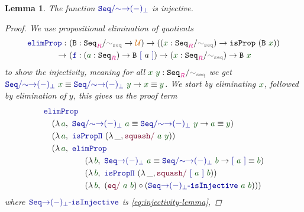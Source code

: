 \documentclass[twoside,11pt,openright]{report}
\theoremstyle{plain} %
\newtheorem{lem}[thm]{Lemma}
\theoremstyle{definition}
\theoremstyle{remark}
\newcommand*{\term}[1]{\textcolor{green!30!black}{#1}} %
\newcommand*{\type}[1]{\textcolor{magenta!90!black}{#1}}
\newcommand*{\universe}[1]{\textcolor{orange!80!black}{#1}}
\newcommand*{\relation}[1]{\textcolor{gray}{\ensuremath{\mathtt{#1}}}}
\newcommand*{\function}[1]{\textcolor{blue!60!black}{\ensuremath{\mathtt{#1}}}}
\newcommand*{\constructor}[1]{\textcolor{purple!60!black}{\ensuremath{\mathtt{#1}}}}
\newcommand*{\typeformer}[1]{\ensuremath{\mathtt{#1}}}
\begin{document}
\begin{lem}
  The function \(\function{Seq/{\sim}{\rightarrow}(-)_\bot}\) is injective.
  \begin{proof}
    We use propositional elimination of quotients 
    \begin{equation}
      \begin{aligned}
        \function{elimProp} :~& (\typeformer{B} :\typeformer{Seq}_{\type{R}} / \relation{\sim_{seq}} \rightarrow \universe{\mathcal{U}}) \rightarrow ((\term{x} : \typeformer{Seq}_{\type{R}} / \relation{\sim_{seq}}) \rightarrow \typeformer{isProp}~(\typeformer{B}~\term{x})) \\
        \rightarrow~& (\function{f} : (\term{a} : \typeformer{Seq}_{\type{R}}) \rightarrow \typeformer{B}~\function{[}~a~\function{]}) \rightarrow (\term{x} : \typeformer{Seq}_{\type{R}} / \relation{\sim_{seq}}) \rightarrow \typeformer{B}~\term{x}
      \end{aligned}
    \end{equation}
    to show the injectivity, meaning for all \(\term{x}~\term{y} : \typeformer{Seq}_{\type{R}} / \relation{\sim_{seq}}\) we get \(\function{Seq/{\sim}{\rightarrow}(-)_\bot}~\term{x} \equiv \function{Seq/{\sim}{\rightarrow}(-)_\bot}~\term{y} \rightarrow \term{x} \equiv \term{y}\). We start by eliminating \(\term{x}\), followed by elimination of \(y\), this gives us the proof term 
    \begin{equation}
      \begin{aligned}
        &\function{elimProp} \\
        &\quad (\lambda\,\term{a},~\function{Seq/{\sim}{\rightarrow}(-)_\bot}~\term{a} \equiv \function{Seq/{\sim}{\rightarrow}(-)_\bot}~\term{y} \rightarrow \term{a} \equiv \term{y}) \\
        &\quad (\lambda\,\term{a},~\function{isProp\Pi}~(\lambda\,\_, \constructor{squash/}~\term{a}~\term{y})) \\
        &\quad (\lambda\,\term{a},~\function{elimProp} \\
        &\qquad\qquad\quad (\lambda\,\term{b},~\function{Seq{\rightarrow}(-)_\bot}~\term{a} \equiv \function{Seq/{\sim}{\rightarrow}(-)_\bot}~\term{b} \rightarrow \function{[}~\term{a}~\function{]} \equiv \term{b}) \\
        &\qquad\qquad\quad (\lambda\,\term{b},~\function{isProp\Pi}~(\lambda\,\_, \constructor{squash/}~\function{[}~\term{a}~\function{]}~\term{b})) \\
        &\qquad\qquad\quad (\lambda\,\term{b},~(\constructor{eq/}~\term{a}~\term{b}) \circ (\function{Seq{\rightarrow}(-)_\bot\text{-}isInjective}~\term{a}~\term{b})))
      \end{aligned}
    \end{equation}
    where \(\function{Seq{\rightarrow}(-)_\bot\text{-}isInjective}\) is \eqref{eq:injectivity-lemma}, 
  \end{proof}
\end{lem}
\end{document}
